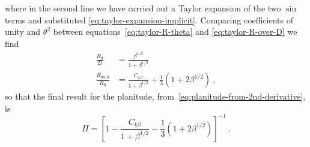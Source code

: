 where in the second line we have carried out a Taylor expansion of the
two \(\sin\) terms and substituted
\eqref{eq:taylor-expansion-implicit}.  Comparing coefficients of unity
and \(\theta^2\) between equations~\eqref{eq:taylor-R-theta} and
\eqref{eq:taylor-R-over-D} we find
\begin{align}
  \label{eq:again-R0-over-D}
  \frac{R_0} {D} &= \frac{\beta^{1/2}}{1+\beta^{1/2}} \\
  \label{eq:final-second-derivative}
  \frac{R_{\theta\theta,0}} {R_0} &= \frac{C_{k\beta}}{1+\beta^{1/2}}+\frac{1}{3}\left(1+2\beta^{1/2}\right) \ ,
\end{align}
so that the final result for the planitude, from~\eqref{eq:planitude-from-2nd-derivative}, is
\begin{equation}
  \label{eq:final-planitude}
  \Pi = \left[ {1 - \frac{C_{k\beta}}{1+\beta^{1/2}} - \frac{1}{3}\left(1+2\beta^{1/2}\right)}
  \right]^{-1} \ .
\end{equation}


